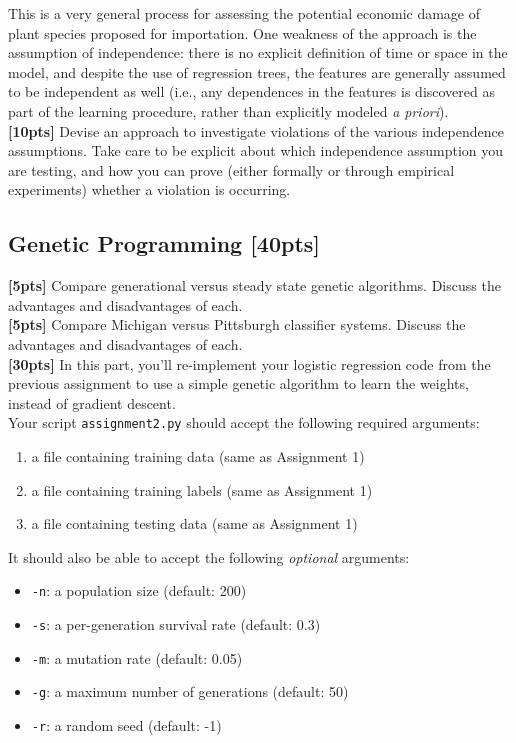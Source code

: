 \documentclass[paper=a4, fontsize=11pt]{scrartcl} %
\numberwithin{figure}{section} %
\numberwithin{table}{section} %
\begin{document}
This is a very general process for assessing the potential economic damage of plant species proposed for importation. One weakness of the approach is the assumption of independence: there is no explicit definition of time or space in the model, and despite the use of regression trees, the features are generally assumed to be independent as well (i.e., any dependences in the features is discovered as part of the learning procedure, rather than explicitly modeled \emph{a priori}). \\

\textbf{[10pts]} Devise an approach to investigate violations of the various independence assumptions. Take care to be explicit about which independence assumption you are testing, and how you can prove (either formally or through empirical experiments) whether a violation is occurring.

\subsection{Genetic Programming \textbf{[40pts]}}

\textbf{[5pts]} Compare generational versus steady state genetic algorithms. Discuss the advantages and disadvantages of each. \\

\textbf{[5pts]} Compare Michigan versus Pittsburgh classifier systems. Discuss the advantages and disadvantages of each. \\

\textbf{[30pts]} In this part, you'll re-implement your logistic regression code from the previous assignment to use a simple genetic algorithm to learn the weights, instead of gradient descent. \\

Your script \texttt{assignment2.py} should accept the following required arguments:

\begin{enumerate}
	\item a file containing training data (same as Assignment 1)
	\item a file containing training labels (same as Assignment 1)
	\item a file containing testing data (same as Assignment 1)
\end{enumerate}

It should also be able to accept the following \emph{optional} arguments:

\begin{itemize}
	\item \texttt{-n}: a population size (default: 200)
	\item \texttt{-s}: a per-generation survival rate (default: 0.3)
	\item \texttt{-m}: a mutation rate (default: 0.05)
	\item \texttt{-g}: a maximum number of generations (default: 50)
	\item \texttt{-r}: a random seed (default: -1)
\end{itemize}
\end{document}
